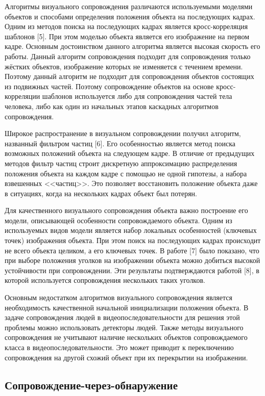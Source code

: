 Алгоритмы визуального сопровождения различаются используемыми моделями объектов и способами определения положения объекта на последующих кадрах. Одним из методов поиска на последующих кадрах является кросс-корреляция шаблонов [5]. При этом моделью объекта является его изображение на первом кадре. Основным достоинством данного алгоритма является высокая скорость его работы. Данный алгоритм сопровождения подходит для сопровождения только жёстких объектов, изображение которых не изменяется с течением времени. Поэтому данный алгоритм не подходит для сопровождения объектов состоящих из подвижных частей. Поэтому сопровождение объектов на основе кросс-корреляции шаблонов используется либо для сопровождения частей тела человека, либо как один из начальных этапов каскадных алгоритмов сопровождения.

Широкое распространение в визуальном сопровождении получил алгоритм, названный фильтром частиц [6]. Его особенностью является метод поиска возможных положений объекта на следующем кадре. В отличие от предыдущих методов фильтр частиц строит дискретную аппроксимацию распределения положения объекта на каждом кадре с помощью не одной гипотезы, а набора взвешенных <<частиц>>. Это позволяет восстановить положение объекта даже в ситуациях, когда на нескольких кадрах объект был потерян.

Для качественного визуального сопровождения объекта важно построение его модели, описывающей особенности сопровождаемого объекта. Одним из используемых видов модели является набор локальных особенностей (ключевых точек) изображения объекта. При этом поиск на последующих кадрах происходит не всего объекта целиком, а его ключевых точек. В работе [7] было показано, что при выборе положения уголков на изображении объекта можно добиться высокой устойчивости при сопровождении. Эти результаты подтверждаются работой [8], в которой используется сопровождения нескольких таких уголков.

Основным недостатком алгоритмов визуального сопровождения является необходимость качественной начальной инициализации положения объекта. В задаче сопровождения людей в видеопоследовательности для решения этой проблемы можно использовать детекторы людей. Также методы визуального сопровождения не учитывают наличие нескольких объектов сопровождаемого класса в видеопоследовательности. Это может приводит к переключению сопровождения на другой схожий объект при их перекрытии на изображении.

\subsection{Сопровождение-через-обнаружение}

